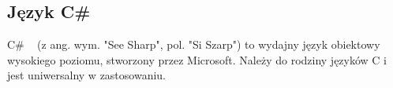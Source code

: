 \subsection{Język C\#}

C\# ~\cite{csharpDocs} (z ang. wym. "See Sharp", pol. "Si Szarp") to wydajny język obiektowy wysokiego poziomu, 
stworzony przez Microsoft.
Należy do rodziny języków C i jest uniwersalny w zastosowaniu.
